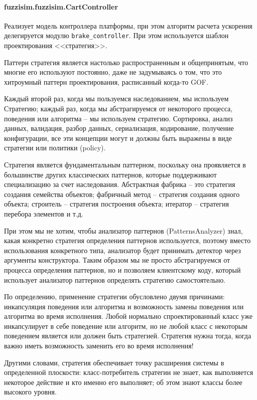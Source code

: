 \paragraph{fuzzisim.fuzzisim.CartController}


Реализует модель контроллера платформы, при этом алгоритм расчета ускорения делегируется модулю \lstinline!brake_controller!. При этом используется шаблон проектирования <<стратегия>>.

Паттерн стратегия является настолько распространенным и общепринятым, что многие его используют постоянно, даже не задумываясь о том, что это хитроумный паттерн проектирования, расписанный когда-то GOF.

Каждый второй раз, когда мы пользуемся наследованием, мы используем Стратегию; каждый раз, когда мы абстрагируемся от некоторого процесса, поведения или алгоритма – мы используем стратегию. Сортировка, анализ данных, валидация, разбор данных, сериализация, кодирование, получение конфигурации, все эти концепции могут и должны быть выражены в виде стратегии или политики (policy).

Стратегия является фундаментальным паттерном, поскольку она проявляется в большинстве других классических паттернов, которые поддерживают специализацию за счет наследования. Абстрактная фабрика – это стратегия создания семейства объектов; фабричный метод – стратегия создания одного объекта; строитель – стратегия построения объекта; итератор – стратегия перебора элементов и т.д.

При этом мы не хотим, чтобы анализатор паттернов (PatternsAnalyzer) знал, какая конкретно стратегия определения паттернов используется, поэтому вместо использования конкретного типа, анализатор будет принимать детектор через аргументы конструктора. Таким образом мы не просто абстрагируемся от процесса определения паттернов, но и позволяем клиентскому коду, который использует анализатор паттернов определять стратегию самостоятельно.

По определению, применение стратегии обусловлено двумя причинами:  инкапсуляция поведения или алгоритма и  возможность замены поведения или алгоритма во время исполнения. Любой нормально спроектированный класс уже инкапсулирует в себе поведение или алгоритм, но не любой класс с некоторым поведением является или должен быть стратегией. Стратегия нужна тогда, когда важно иметь возможность заменить его во время исполнения!

Другими словами, стратегия обеспечивает точку расширения системы в определенной плоскости: класс-потребитель стратегии не знает, как выполняется некоторое действие и кто именно его выполняет; об этом знают классы более высокого уровня.

